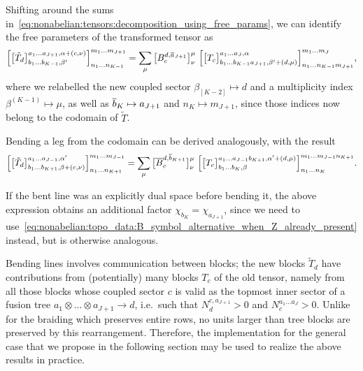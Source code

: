 %
Shifting around the sums in~\eqref{eq:nonabelian:tensors:decomposition_using_free_params}, we can identify the free parameters of the transformed tensor as 
\begin{equation}
    \label{eq:nonabelian:tensors:result_bending}
    \Big[ \big[ \tilde{T}_d \big]^{a_1\dots a_{J+1}, \alpha + (c,\nu)}_{b_1\dots b_{K-1},\beta'} \Big]^{m_1\dots m_{J+1}}_{n_1\dots n_{K-1}}
    = \sum_\mu \big[ B^{d, \overline{a}_{J+1}}_c \big]^{\mu}_{\nu}
    ~
    \Big[ \big[ T_c \big]^{a_1\dots a_J, \alpha}_{b_1\dots b_{K-1} a_{J+1},\beta' + (d,\mu)} \Big]^{m_1\dots m_J}_{n_1\dots n_{K-1} m_{J+1}}
    ,
\end{equation}
where we relabelled the new coupled sector $\beta_{[K-2]} \mapsto d$ and a multiplicity index $\beta^{(K-1)} \mapsto \mu$, as well as $\overline{b}_K \mapsto a_{J+1}$ and $n_K \mapsto m_{J+1}$, since those indices now belong to the codomain of $\tilde{T}$.

Bending a leg from the codomain can be derived analogously, with the result
\begin{equation}
    \Big[ \big[ \tilde{T}_d \big]^{a_1\dots a_{J-1}, \alpha'}_{b_1\dots b_{K+1},\beta +
    (c,\nu)} \Big]^{m_1\dots m_{J-1}}_{n_1\dots n_{K+1}}
    = \sum_\mu \big[ \overline{B}^{d, \overline{b}_{K+1}}_c \big]^{\mu}_{\nu}
    ~
    \Big[ \big[ T_c \big]^{a_1\dots a_{J-1}b_{K+1}, \alpha'+(d,\mu)}_{b_1\dots b_{K},\beta} \Big]^{m_1\dots m_{J-1}n_{K+1}}_{n_1\dots n_{K}}
    .
\end{equation}

If the bent line was an explicitly dual space before bending it, the above expression obtains an additional factor $\chi_{b_K} = \chi_{{a}_{J+1}}$, since we need to use~\eqref{eq:nonabelian:topo_data:B_symbol_alternative_when_Z_already_present} instead, but is otherwise analogous.

Bending lines involves communication between blocks; the new blocks $\tilde{T}_d$ have contributions from (potentially) many blocks $T_c$ of the old tensor, namely from all those blocks whose coupled sector $c$ is valid as the topmost inner sector of a fusion tree $a_1 \otimes \dots \otimes a_{J+1} \to d$, i.e.~such that $N^{c,a_{J+1}}_d > 0$ and $N^{a_1\dots a_J}_c > 0$.
%
Unlike for the braiding which preserves entire rows, no units larger than tree blocks are preserved by this rearrangement.
%
Therefore, the implementation for the general case that we propose in the following section may be used to realize the above results in practice.


